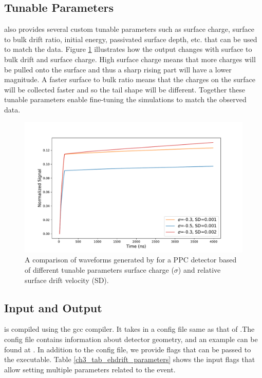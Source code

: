 \subsection{Tunable Parameters}
{\ehd} also provides several custom tunable parameters such as surface charge, surface to bulk drift ratio, initial energy, passivated surface depth, etc. that can be used to match the data. Figure \ref{fig:wf_comp} illustrates how the output changes with surface to bulk drift and surface charge. High surface charge means that more charges will be pulled onto the surface and thus a sharp rising part will have a lower magnitude. A faster surface to bulk ratio means that the charges on the surface will be collected faster and so the tail shape will be different. Together these tunable parameters enable fine-tuning the simulations to match the observed data.

\begin{figure}%
    \includegraphics[trim={0.1cm 0.3cm 1.3cm 0.3cm},clip,width=0.99\linewidth]{ch3/figs/wf_comp.pdf}
    \caption{A comparison of waveforms generated by {\ehd} for a {\Ltwo} PPC detector based of different tunable parameters surface charge ($\sigma$) and relative surface drift velocity (SD).}
    \label{fig:wf_comp}
\end{figure}


\subsection{Input and Output}
{\ehd} is compiled using the gcc compiler. It takes in a config file same as that of {\siggen}.The config file contains information about detector geometry, and an example can be found at \cite{ehdrift2024}. In addition to the config file, we provide flags that can be passed to the executable. Table \ref{ch3_tab_ehdrift_parameters} shows the input flags that allow setting multiple parameters related to the event.



